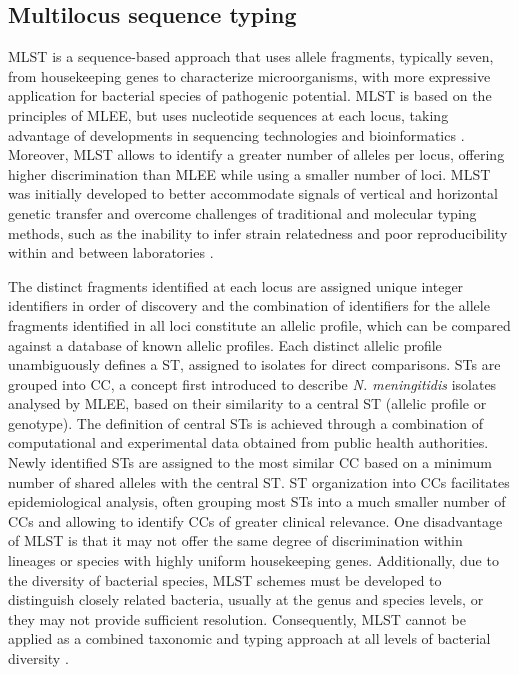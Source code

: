 \subsection{Multilocus sequence typing}

\ac{MLST} is a sequence-based approach that uses allele fragments, typically seven, from housekeeping genes to characterize microorganisms, with more expressive application for bacterial species of pathogenic potential. \ac{MLST} is based on the principles of \ac{MLEE}, but uses nucleotide sequences at each locus, taking advantage of developments in sequencing technologies and bioinformatics \cite{urwin_multi-locus_2003}. Moreover, \ac{MLST} allows to identify a greater number of alleles per locus, offering higher discrimination than \ac{MLEE} while using a smaller number of loci. \ac{MLST} was initially developed to better accommodate signals of vertical and horizontal genetic transfer and overcome challenges of traditional and molecular typing methods, such as the inability to infer strain relatedness and poor reproducibility within and between laboratories \cite{maiden_multilocus_1998}.

The distinct fragments identified at each locus are assigned unique integer identifiers in order of discovery and the combination of identifiers for the allele fragments identified in all loci constitute an allelic profile, which can be compared against a database of known allelic profiles. Each distinct allelic profile unambiguously defines a \ac{ST}, assigned to isolates for direct comparisons. \ac{ST}s are grouped into \ac{CC}, a concept first introduced to describe \textit{N. meningitidis} isolates analysed by \ac{MLEE}, based on their similarity to a central \ac{ST} (allelic profile or genotype). The definition of central \ac{ST}s is achieved through a combination of computational and experimental data obtained from public health authorities. Newly identified \ac{ST}s are assigned to the most similar \ac{CC} based on a minimum number of shared alleles with the central \ac{ST}. \ac{ST} organization into \ac{CC}s facilitates epidemiological analysis, often grouping most \ac{ST}s into a much smaller number of \ac{CC}s and allowing to identify \ac{CC}s of greater clinical relevance. One disadvantage of \ac{MLST} is that it may not offer the same degree of discrimination within lineages or species with highly uniform housekeeping genes. Additionally, due to the diversity of bacterial species, \ac{MLST} schemes must be developed to distinguish closely related bacteria, usually at the genus and species levels, or they may not provide sufficient resolution. Consequently, \ac{MLST} cannot be applied as a combined taxonomic and typing approach at all levels of bacterial diversity \cite{jolley_ribosomal_2012}.

